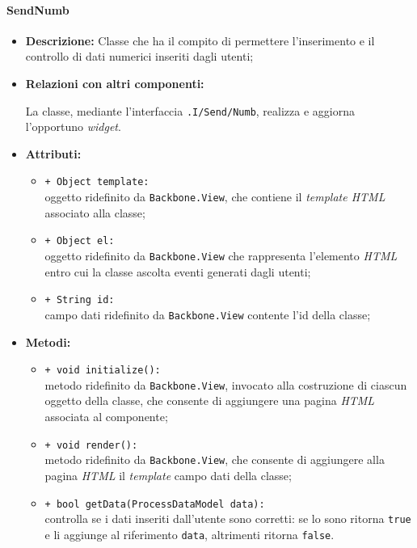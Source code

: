 \paragraph{SendNumb}
\label{sendNumb}
\begin{flushleft}
\begin{itemize}
\item \textbf{Descrizione:} Classe che ha il compito di permettere l'inserimento e il controllo di dati numerici inseriti dagli utenti;
\item \textbf{Relazioni con altri componenti:}
\begin{sloppypar}
La classe, mediante l'interfaccia \texttt{\viewUser{}.I\fshyp{}Send\fshyp{}Numb}, realizza e aggiorna l'opportuno \textit{widget}.
\end{sloppypar}
\item \textbf{Attributi:}
\begin{sloppypar}
\begin{itemize}
\item \texttt{+ Object template:}\\ oggetto ridefinito da \texttt{Backbone.View}, che contiene il \textit{template HTML} associato alla classe;
\item \texttt{+ Object el:}\\ oggetto ridefinito da \texttt{Backbone.View} che rappresenta l'elemento \textit{HTML} entro cui la classe ascolta eventi generati dagli utenti;
\item \texttt{+ String id:}\\ campo dati ridefinito da \texttt{Backbone.View} contente l'id della classe;
\end{itemize}
\end{sloppypar}
\item \textbf{Metodi:}
\begin{sloppypar}
\begin{itemize}
\item \texttt{+ void initialize():}\\ metodo ridefinito da \texttt{Backbone.View}, invocato alla costruzione di ciascun oggetto della classe, che consente di aggiungere una pagina \textit{HTML} associata al componente;
\item \texttt{+ void render():}\\ metodo ridefinito da \texttt{Backbone.View}, che consente di aggiungere alla pagina \textit{HTML} il \textit{template} campo dati della classe;
\item \texttt{+ bool getData(ProcessDataModel data):}\\ controlla se i dati inseriti dall'utente sono corretti: se lo sono ritorna \texttt{true} e li aggiunge al riferimento \texttt{data}, altrimenti ritorna \texttt{false}.
\end{itemize}
\end{sloppypar}
\end{itemize}
\end{flushleft}

